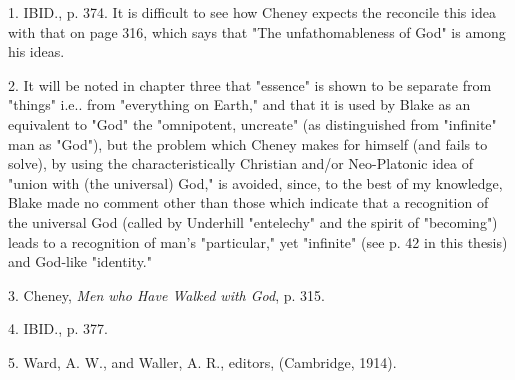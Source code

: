 1. IBID., p. 374. It is difficult to see how Cheney expects the reconcile this idea with that on page 316, which
says that "The unfathomableness of God" is among his ideas.\par
2. It will be noted in chapter three that "essence" is
shown to be separate from "things" i.e.. from "everything on Earth," and that it is used by Blake as an equivalent to
"God" the "omnipotent, uncreate" (as distinguished from "infinite" man as "God"), but the problem which Cheney makes
for himself (and fails to solve), by using the characteristically Christian and/or Neo-Platonic idea of "union with
(the universal) God," is avoided, since, to the best of my knowledge, Blake made no comment other than those which 
indicate that a recognition of the universal God (called by Underhill "entelechy" and the spirit of "becoming") leads
to a recognition of man's "particular," yet "infinite" (see p. 42 in this thesis) and God-like "identity."\par
3. Cheney, \textit{Men who Have Walked with God}, p. 315.\par
4. IBID., p. 377.\par
5. Ward, A. W., and Waller, A. R., editors, (Cambridge, 1914).\par

\newpage

{}

